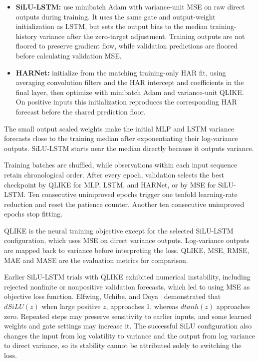\documentclass[12pt,a4paper]{article}
\numberwithin{equation}{section}
\numberwithin{table}{section}
\numberwithin{figure}{section}
\begin{document}
\begin{itemize}
    \item \textbf{SiLU-LSTM:} use minibatch Adam with variance-unit MSE on raw direct outputs during training. It uses the same gate and output-weight initialization as LSTM, but sets the output bias to the median training-history variance after the zero-target adjustment. Training outputs are not floored to preserve gradient flow, while validation predictions are floored before calculating validation MSE.
    \item \textbf{HARNet:} initialize from the matching training-only HAR fit, using averaging convolution filters and the HAR intercept and coefficients in the final layer, then optimize with minibatch Adam and variance-unit QLIKE. On positive inputs this initialization reproduces the corresponding HAR forecast before the shared prediction floor.
\end{itemize}
The small output scaled weights make the initial MLP and LSTM variance forecasts close to the training median after exponentiating their log-variance outputs. SiLU-LSTM starts near the median directly because it outputs variance. 

Training batches are shuffled, while observations within each input sequence retain chronological order. After every epoch, validation selects the best checkpoint by QLIKE for MLP, LSTM, and HARNet, or by MSE for SiLU-LSTM. Ten consecutive unimproved epochs trigger one tenfold learning-rate reduction and reset the patience counter. Another ten consecutive unimproved epochs stop fitting. 

QLIKE is the neural training objective except for the selected SiLU-LSTM configuration, which uses MSE on direct variance outputs. Log-variance outputs are mapped back to variance before interpreting the loss. QLIKE, MSE, RMSE, MAE and MASE are the evaluation metrics for comparison. 

Earlier SiLU-LSTM trials with QLIKE exhibited numerical instability, including rejected nonfinite or nonpositive validation forecasts, which led to using MSE as objective loss function. Elfwing, Uchibe, and Doya~\cite{elfwing2017} demonstrated that  $dSiLU(z)$ when large positive $z$, approaches 1, whereas $dtanh(z)$ approaches zero. Repeated steps may preserve sensitivity to earlier inputs, and some learned weights and gate settings may increase it. The successful SiLU configuration also changes the input from log volatility to variance and the output from log variance to direct variance, so its stability cannot be attributed solely to switching the loss.
\end{document}
